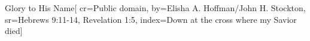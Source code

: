 {Glory to His Name}[
    cr={Public domain},
    by={Elisha A. Hoffman/John H. Stockton},
    sr={Hebrews 9:11-14, Revelation 1:5},
    index={Down at the cross where my Savior died}]

